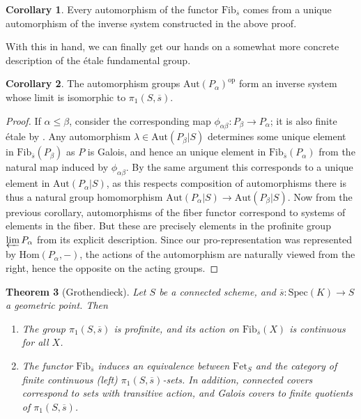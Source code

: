 \documentclass{article}
\newtheorem{theorem}{Theorem}[section]
\theoremstyle{definition}
\newtheorem{corollary}[theorem]{Corollary}
\theoremstyle{remark}
\theoremstyle{plain}
\begin{document}
\begin{corollary}
	Every automorphism of the functor $\text{Fib}_{\overline{s}}$ comes from a unique automorphism of the inverse system constructed in the above proof.
\end{corollary}

With this in hand, we can finally get our hands on a somewhat more concrete description of the \'etale fundamental group.

\begin{corollary}
	The automorphism groups $\text{Aut}(P_{\alpha})^{\text{op}}$ form an inverse system whose limit is isomorphic to $\pi_1(S, \overline{s})$.
\end{corollary}

\begin{proof}
	
	If $\alpha \leq \beta$, consider the corresponding map $\phi_{\alpha \beta}: P_{\beta} \to P_{\alpha}$; it is also finite \'etale by .
	Any automorphism $\lambda \in \text{Aut}(P_{\beta}|S)$ determines some unique element in $\text{Fib}_{\overline{s}}(P_{\beta})$ as $P$ is Galois, and hence an unique element in $\text{Fib}_{\overline{s}}(P_{\alpha})$ from the natural map induced by $\phi_{\alpha \beta}$.
By the same argument this corresponds to a unique element in $\text{Aut}(P_{\alpha}|S)$, as this respects composition of automorphisms there is thus a natural group homomorphism $\text{Aut}(P_{\alpha}|S) \to \text{Aut}(P_{\beta}|S)$.
Now from the previous corollary, automorphisms of the fiber functor correspond to systems of elements in the fiber.
But these are precisely elements in the profinite group $\varprojlim P_{\alpha}$ from its explicit description.
Since our pro-representation was represented by $\text{Hom}(P_{\alpha}, -)$, the actions of the automorphism are naturally viewed from the right, hence the opposite on the acting groups.
\end{proof}

\begin{theorem}[Grothendieck]
	Let $S$ be a connected scheme, and $\overline{s}: \text{Spec}(K) \to S$ a geometric point. Then \begin{enumerate} 
		\item The group $\pi_1(S, \overline{s})$ is profinite, and its action on $\text{Fib}_{\overline{s}}(X)$ is continuous for all $X$.
		\item The functor $\text{Fib}_{\overline{s}}$ induces an equivalence between $\text{Fet}_S$ and the category of finite continuous (left) $\pi_1(S, \overline{s})$-sets.	In addition, connected covers correspond to sets with transitive action, and Galois covers to finite quotients of $\pi_1(S, \overline{s})$.
 \end{enumerate} 
\end{theorem}
\end{document}
